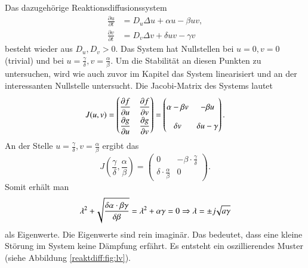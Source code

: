 Das dazugehörige Reaktionsdiffusionssystem
\begin{align*}
    \frac{\partial u}{\partial t} &= D_u \Delta u + \alpha u - \beta u v,
    \\
    \frac{\partial v}{\partial t} &= D_v \Delta v + \delta u v - \gamma v
\end{align*}
besteht wieder aus \(D_u,D_v > 0\).
Das System hat Nullstellen bei  \(u = 0,v = 0\) (trivial) und bei \(u = \frac{\gamma}{\delta}, v = \frac{\alpha}{\beta}\).
Um die Stabilität an diesen Punkten zu untersuchen, wird wie auch zuvor im Kapitel das System linearisiert und an der interessanten Nullstelle untersucht.
Die Jacobi-Matrix des Systems lautet
\begin{equation*}
        J(u,v) =
	\bgroup
	\renewcommand{\arraystretch}{1.9}
        \begin{pmatrix}
	\displaystyle
        \frac{\partial f}{\partial u} &
	\displaystyle
	\frac{\partial f}{\partial v} \\
	\displaystyle
        \frac{\partial g}{\partial u} &
	\displaystyle
	\frac{\partial g}{\partial v}
        \end{pmatrix}
	\egroup
        =
        \begin{pmatrix}
        \alpha - \beta v & -\beta u \\
        \delta v & \delta u - \gamma
        \end{pmatrix}.
\end{equation*}
An der Stelle \(u = \frac{\gamma}{\delta}, v = \frac{\alpha}{\beta}\) ergibt das
\begin{equation*}
         J\left(\frac{\gamma}{\delta},\frac{\alpha}{\beta}\right) =
        \begin{pmatrix}
        0 & -\beta \cdot\frac{\gamma}{\delta} \\
        \delta \cdot \frac{\alpha}{\beta} & 0
        \end{pmatrix}. 
\end{equation*}
Somit erhält man
\begin{equation*}
    \lambda^2 + \!\sqrt{\frac{\delta \alpha \cdot \beta \gamma}{\delta \beta}}
     = 
     \lambda^2 + \alpha \gamma = 0 
     \Rightarrow
     \lambda = \pm j \!\sqrt{a\gamma\mathstrut}
\end{equation*}
als Eigenwerte.
Die Eigenwerte sind rein imaginär.
Das bedeutet, dass eine kleine Störung im System keine Dämpfung erfährt.
Es entsteht ein oszillierendes Muster (siehe Abbildung \ref{reaktdiff:fig:lv}).


